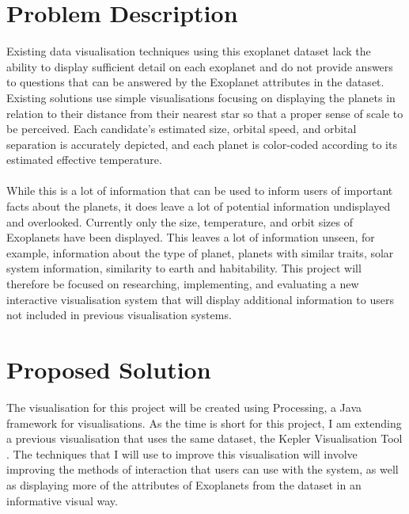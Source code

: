 \documentclass[11pt
              , a4paper
              , twoside
              , openright
              ]{report}
\begin{document}
\section{Problem Description}
Existing data visualisation techniques using this exoplanet dataset lack the
ability to display
sufficient detail on each exoplanet and do not provide answers to questions that
can be answered by the Exoplanet attributes in the dataset. Existing solutions
use simple visualisations focusing on displaying
the planets in relation to their distance from their nearest star so that a
proper sense of
scale to be perceived. Each candidate’s estimated size, orbital speed, and
orbital separation
is accurately depicted, and each planet is color-coded according to its
estimated effective
temperature.
\\\\
While this is a lot of information that can be used to inform users of important
facts about
the planets, it does leave a lot of potential information undisplayed and
overlooked. Currently only the size, temperature, and orbit sizes of Exoplanets
have been displayed. This leaves a lot of information unseen, for example,
information about the type of planet, planets with similar traits, solar system
information, similarity to earth and habitability. This project will therefore
be focused on researching, implementing, and evaluating a new
interactive visualisation system that will display additional information to
users not included in previous visualisation systems.
\section{Proposed Solution}
The visualisation for this project will be created using Processing, a Java
framework for visualisations. As the time is short for this project, I am
extending a previous visualisation that uses the same dataset, the Kepler
Visualisation Tool \cite{kepler_github, kepler_article}. The techniques that I
will use to improve this visualisation will involve improving the methods of
interaction that users can use with the system, as well as displaying more of
the attributes of Exoplanets from the dataset in an informative visual way. 
\end{document}
